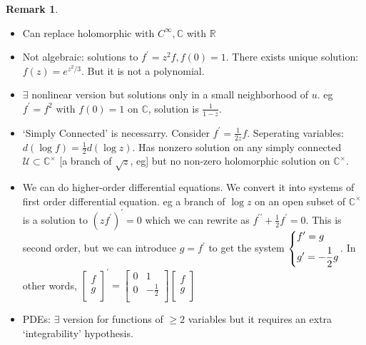 \documentclass{article}
\theoremstyle{definition}
\newtheorem*{remark}{Remark}
\begin{document}
    \begin{remark}
        \begin{itemize}
            \item Can replace holomorphic with \(C^{\infty}, \mathbb{C}\) with \(\mathbb{R}\)
            \item Not algebraic: solutions to \(f^{\prime} = z^2 f, f(0)=1\). There exists unique solution: \(f(z)=e^{z^2 / 3}\). But it is not a polynomial.
            \item \(\exists\) nonlinear version but solutions only in a small neighborhood of \(u\). eg \(f^{\prime} =f^2\) with \(f(0)=1\) on \(\mathbb{C}\), solution is \(\frac{1}{1-z}\).
            \item `Simply Connected' is necessarry. Consider \(f^{\prime} = \frac{1}{2z}f\). Seperating variables: \(d(\log f) = \frac{1}{2} d(\log z)\). Has nonzero solution on any simply connected \(\mathcal{U} \subset \mathbb{C}^\times\) [a branch of \(\sqrt{z} \), eg] but no non-zero holomorphic solution on \(\mathbb{C}^\times\).
            \item We can do higher-order differential equations. We convert it into systems of first order differential equation. eg a branch of \(\log z\) on an open subset of \(\mathbb{C}^\times\) is a solution to \((zf^{\prime})^{\prime} = 0\) which we can rewrite as \(f^{\prime\prime} + \frac{1}{2} f^{\prime} = 0\). This is second order, but we can introduce \(g = f^{\prime}\) to get the system \(\begin{dcases}
                f^{\prime} = g\\
                g^{\prime} = -\frac{1}{2}g
            \end{dcases}\). In other words, \(\begin{bmatrix}
                f \\
                g \\
            \end{bmatrix}^{\prime} = \begin{bmatrix}
                0 & 1 \\
                0 & -\frac{1}{2} \\
            \end{bmatrix} \begin{bmatrix}
                f \\
                g \\
            \end{bmatrix}\)
            \item PDEs: \(\exists\) version for functions of \(\geq 2\) variables but it requires an extra `integrability' hypothesis.
            

\end{itemize}
\end{remark}
\end{document}
